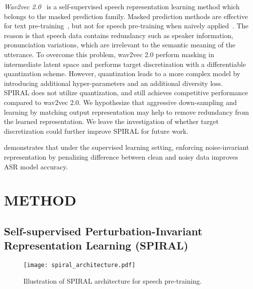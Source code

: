 \textit{Wav2vec 2.0}~\citep{wav2vec2} is a self-supervised speech representation learning method which belongs to the masked prediction family. Masked prediction methods are effective for text pre-training~\citep{DevlinCLT19}, but not for speech pre-training when naively applied~\citep{baevski2019effectiveness}. The reason is that speech data contains redundancy such as speaker information, pronunciation variations, which are irrelevant to the semantic meaning of the utterance.
To overcome this problem, wav2vec 2.0 perform masking in intermediate latent space and performs target discretization with a differentiable quantization scheme. 
However, quantization leads to a more complex model by introducing additional hyper-parameters and an additional diversity loss.
SPIRAL does not utilize quantization, and still achieves competitive performance compared to wav2vec 2.0.
We hypothesize that aggressive down-sampling and learning by matching output representation may help to remove redundancy from the learned representation.
We leave the investigation of whether target discretization could further improve SPIRAL for future work.

\citet{liang2018learning} demonstrates that under the supervised learning setting, enforcing noise-invariant representation by penalizing difference between clean and noisy data improves ASR model accuracy. 

\section{METHOD}
\label{method}

\subsection{Self-supervised Perturbation-Invariant Representation Learning (SPIRAL)}

\begin{figure}[th]
   \centering
   \texttt{[image: spiral\_architecture.pdf]}
   \caption{Illustration of SPIRAL architecture for speech pre-training.}
   \label{fig:spiral_architecture}
\end{figure}

